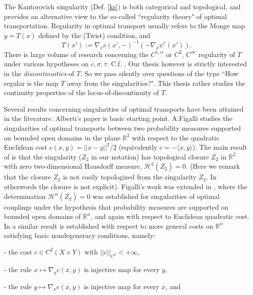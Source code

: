 \documentclass[12pt]{amsart}
\theoremstyle{definition}
\theoremstyle{remark}
\newcommand{\bR}{\mathbb{R}}
\begin{document}

The Kantorovich singularity (Def. \ref{ks}) is both categorical and topological, and provides an alternative view to the so-called ``regularity theory" of optimal transportation. Regularity in optimal transport usually refers to the Monge map $y=T(x)$ defined by the (Twist) condition, and $$T(x'):=\nabla_x c(x',-)^{-1} (-\nabla_x \psi^c(x')).$$ There is large volume of research concerning the $C^{1, \alpha}$ or $C^2$, $C^\infty$ regularity of $T$ under various hypotheses on $c, \sigma, \tau$. C.f. \cite[Ch.12]{Vil1}. Our thesis however is strictly interested in the \emph{discontinuities} of $T$. So we pass silently over questions of the type ``How regular is the map $T$ away from the singularities?". This thesis rather studies the continuity properties of the locus-of-discontinuity of $T$. 

Several results concerning singularities of optimal transports have been attained in the literature. Alberti's paper \cite{Alberti} is basic starting point.  A.Figalli \cite{Fig} studies the singularities of optimal transports between two probability measures supported on bounded open domains in the plane $\bR^2$ with respect to the quadratic Euclidean cost $c(x,y)=||x-y||^2/2$ (equivalently $c=-\langle x,y\rangle$). The main result of \cite[\S 3.2]{Fig} is that the singularity ($Z_2$ in our notation) has topological closure $\overline{Z_2}$ in $\bR^2$ with zero two-dimensional Hausdorff measure, $\mathscr{H}^2(\overline{Z_2})=0.$ (Here we remark that the closure $\overline{Z_2}$ is not easily topologized from the singularity $Z_2$. In otherwords the closure is not explicit). Figalli's work was extended in \cite{Fig-Kim}, where the determination $\mathscr{H}^n(\overline{Z_2})=0$ was established for singularities of optimal couplings under the hypothesis that probability measures are supported on bounded open domains of $\bR^n$, and again with respect to Euclidean quadratic cost. In \cite{Fig-dP} a similar result is established with respect to more general costs on $\bR^n$ satisfying basic nondegeneracy conditions, namely: 

- the cost $c\in C^2(X\times Y)$ with $||c||_{C^2} <+\infty$, 

- the rule $x\mapsto \nabla_y c(x,y)$ is injective map for every $y$, 

- the rule $y\mapsto \nabla_x c(x,y)$ is injective map for every $x$, and 
\end{document}
